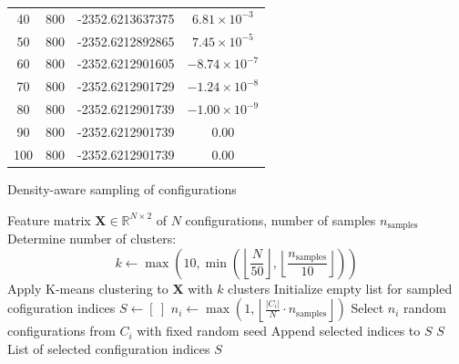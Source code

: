 \begin{table}[htbp]
\begin{tabular}{cccc}
    40 & 800 &  -2352.6213637375 & $6.81 \times 10^{-3}$ \\
    50 & 800 &  -2352.6212892865 & $7.45 \times 10^{-5}$ \\
    60 & 800 &  -2352.6212901605 & $-8.74 \times 10^{-7}$ \\
    70 & 800 &  -2352.6212901729 & $-1.24 \times 10^{-8}$ \\
    80 & 800 &  -2352.6212901739 & $-1.00 \times 10^{-9}$ \\
    90 & 800 &  -2352.6212901739 & $0.00$ \\
    100 & 800 &  -2352.6212901739 & $0.00$ \\
    \bottomrule
    \end{tabular}
\end{table}


\renewcommand{\algorithmicrequire}{\textbf{Input:}}
\renewcommand{\algorithmicensure}{\textbf{Output:}}
\begin{algorithm}[htbp]
    \caption{Density-aware sampling of configurations}
    \label{alg:density_aware_sampling}
    \begin{algorithmic}[1]
    \Require Feature matrix $\mathbf{X} \in \mathbb{R}^{N \times 2}$ of $N$ configurations, number of samples $n_\text{samples}$
    \State Determine number of clusters:
        \[
        k \gets \max\left(10, \min\left(\left\lfloor \frac{N}{50} \right\rfloor, \left\lfloor \frac{n_\text{samples}}{10} \right\rfloor\right)\right)
        \]
    \State Apply K-means clustering to $\mathbf{X}$ with $k$ clusters
    \State Initialize empty list for sampled cofiguration indices $S \gets [\ ]$
        \State $n_i \gets \max\left(1, \left\lfloor \frac{|C_i|}{N} \cdot n_\text{samples} \right\rfloor \right)$
        \State Select $n_i$ random configurations from $C_i$ with fixed random seed
        \State Append selected indices to $S$
    \EndFor
    \State \Return $S$
    \Ensure List of selected configuration indices $S$
    \end{algorithmic}
\end{algorithm}



